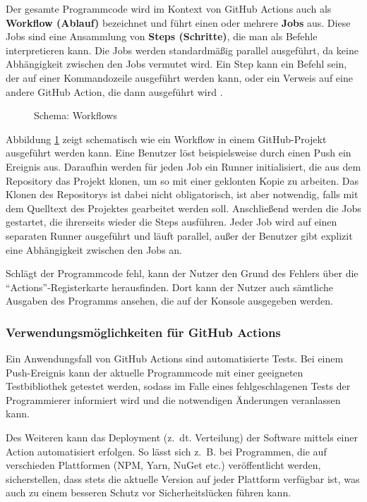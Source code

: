 Der gesamte Programmcode wird im Kontext von GitHub Actions auch als \textbf{Workflow (Ablauf)} bezeichnet und führt einen oder mehrere \textbf{Jobs} aus. Diese Jobs sind eine Ansammlung von \textbf{Steps (Schritte)}, die man als Befehle interpretieren kann. Die Jobs werden standardmäßig parallel ausgeführt, da keine Abhängigkeit zwischen den Jobs vermutet wird. Ein Step kann ein Befehl sein, der auf einer Kommandozeile ausgeführt werden kann, oder ein Verweis auf eine andere GitHub Action, die dann ausgeführt wird \cite[S.~5-7]{github_action_book}. 

\begin{figure}[htpb!]
\fontsize{7}{10}\selectfont
    \centering

    \caption{Schema: Workflows}
    \label{fig:workflow_schema}
\end{figure}

Abbildung \ref{fig:workflow_schema} zeigt schematisch wie ein Workflow in einem GitHub-Projekt ausgeführt werden kann. Eine Benutzer löst beispielsweise durch einen Push ein Ereignis aus. Daraufhin werden für jeden Job ein Runner initialisiert, die aus dem Repository das Projekt klonen, um so mit einer geklonten Kopie zu arbeiten.  Das Klonen des Repositorys ist dabei nicht obligatorisch, ist aber notwendig, falls mit dem Quelltext des Projektes gearbeitet werden soll.  Anschließend werden die Jobs gestartet, die ihrerseits wieder die Steps ausführen. Jeder Job wird auf einen separaten Runner ausgeführt und läuft parallel, außer der Benutzer gibt explizit eine Abhängigkeit zwischen den Jobs an. 


Schlägt der Programmcode fehl, kann der Nutzer den Grund des Fehlers über die  \enquote{Actions}-Registerkarte herausfinden. Dort kann der Nutzer auch sämtliche Ausgaben des Programms ansehen, die auf der Konsole ausgegeben werden.

\subsubsection{Verwendungsmöglichkeiten für GitHub Actions}

Ein Anwendungsfall von GitHub Actions sind automatisierte Tests. Bei einem Push-Ereignis kann der aktuelle Programmcode mit einer geeigneten Testbibliothek getestet werden, sodass im Falle eines fehlgeschlagenen Tests der Programmierer informiert wird und die notwendigen Änderungen veranlassen kann.

Des Weiteren kann das Deployment (z.~dt. Verteilung) der Software mittels einer Action automatisiert erfolgen. So lässt sich z.~B. bei Programmen, die auf verschieden Plattformen (NPM, Yarn, NuGet etc.)  veröffentlicht werden, sicherstellen, dass stets die aktuelle Version auf jeder Plattform verfügbar ist, was auch zu einem besseren Schutz vor Sicherheitslücken führen kann. 

